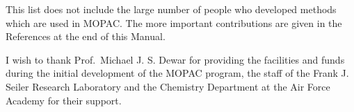 This list does not include  the  large  number  of  people  who
developed  methods  which  are  used  in  MOPAC.  The more important
contributions are given in the References at the end of this Manual.

        I  wish  to  thank  Prof.\ Michael J. S. Dewar  for   providing   the
   facilities and funds during the initial development of the MOPAC program,
   the staff of the Frank J. Seiler Research Laboratory  and  the  Chemistry
   Department at the Air Force Academy for their support.


